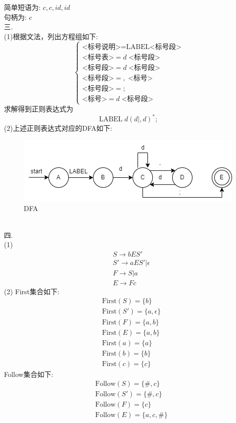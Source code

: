 \documentclass{article}
\begin{document}
简单短语为: $c, c, id, id$ \\
句柄为: $c$ \\ 
三.\\
(1)根据文法，列出方程组如下:
\[
\begin{cases}
    \text{<标号说明>} = \text{LABEL} \text{<标号段>} \\
    \text{<标号表>} = d \; \text{<标号段>} \\
    \text{<标号段>} = d \; \text{<标号段>} \\
    \text{<标号段>} = , \; \text{<标号>} \\
    \text{<标号段>} = ; \\
    \text{<标号>} = d \; \text{<标号段>} 
\end{cases}
\]
求解得到正则表达式为
\[
    \text{LABEL}\; d(d|,d)^{*};
\]
(2)上述正则表达式对应的DFA如下: \\
\begin{figure}[htbp]
    \centering
    \includegraphics[scale=0.6]{DFA.png}
    \caption{DFA}
\end{figure}
\\
四.\\ 
(1)
\begin{align*}
& S \to bES' \\
& S' \to aES' | \epsilon \\
& F \to S | a \\
& E \to Fc
\end{align*}
(2)
First集合如下:
\begin{align*}
& \text{First}(S) = \{b\} \\
& \text{First}(S') = \{a, \epsilon\} \\
& \text{First}(F) = \{a, b\} \\
& \text{First}(E) = \{a, b\} \\
& \text{First}(a) = \{a\} \\
& \text{First}(b) = \{b\} \\
& \text{First}(c) = \{c\}
\end{align*}
Follow集合如下:
\begin{align*}
& \text{Follow}(S) = \{\#, c\} \\
& \text{Follow}(S') = \{\#, c\} \\
& \text{Follow}(F) = \{c\} \\
& \text{Follow}(E) = \{a, c, \#\}
\end{align*}
\end{document}
